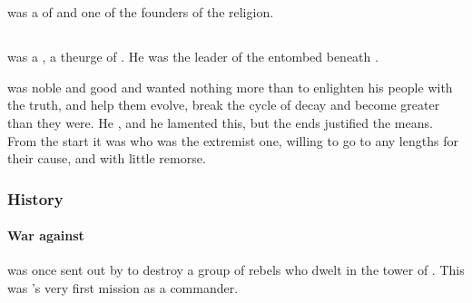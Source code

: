 \chapter{\Merkyrah}















\section{\Berugiel}
\index{\Berugiel}
\Berugiel was a \resphan of \Merkyrah and one of the founders of the \Merkyran religion.















\section{\Damiarch}
\index{\Damiarch}
\Damiarch{} was a \resphan, a theurge of \Merkyrah.
He was the leader of the  entombed beneath \Merkyrah. 

\Damiarch{} was noble and good and wanted nothing more than to enlighten his people with the truth, and help them evolve, break the cycle of decay and become greater than they were. 
He , and he lamented this, but the ends justified the means. 
From the start it was \Gevural{} who was the extremist one, willing to go to any lengths for their cause, and with little remorse. 









\subsection{History}





\subsubsection{War against \Monara}
\Damiarch was once sent out by  to destroy a group of rebels who dwelt in the tower of . 
This was \Damiarch's very first mission as a commander. 

